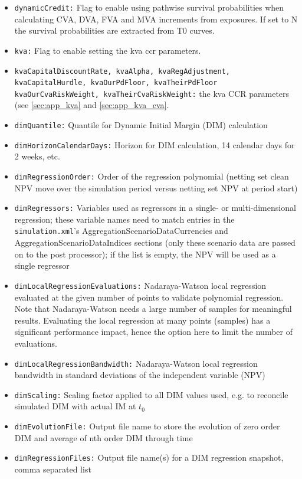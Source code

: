\documentclass[12pt, a4paper]{article}
\begin{document}
\begin{itemize}
\item {\tt dynamicCredit:} Flag to enable using pathwise survival probabilities when calculating CVA, DVA, FVA and MVA increments from exposures. If set to N the survival probabilities are extracted from T0 curves.
\item {\tt kva:} Flag to enable setting the kva ccr parameters.
\item {\tt kvaCapitalDiscountRate, kvaAlpha, kvaRegAdjustment, kvaCapitalHurdle, kvaOurPdFloor, kvaTheirPdFloor kvaOurCvaRiskWeight, kvaTheirCvaRiskWeight:} the kva CCR parameters (see \ref{sec:app_kva} and \ref{sec:app_kva_cva}.
\item {\tt dimQuantile:} Quantile for Dynamic Initial Margin (DIM) calculation
\item {\tt dimHorizonCalendarDays:} Horizon for DIM calculation, 14 calendar days for 2 weeks, etc.
\item {\tt dimRegressionOrder:} Order of the regression polynomial (netting set clean NPV move over the simulation
period versus netting set NPV at period start)
\item {\tt dimRegressors:} Variables used as regressors in a single- or multi-dimensional regression; these variable
  names need to match entries in the {\tt simulation.xml}'s AggregationScenarioDataCurrencies and
  AggregationScenarioDataIndices sections (only these scenario data are passed on to the post processor); if the list is
  empty, the NPV will be used as a single regressor
\item {\tt dimLocalRegressionEvaluations:} Nadaraya-Watson local regression evaluated at the given number of points to
validate polynomial regression. Note that Nadaraya-Watson needs a large number of samples for meaningful
results. Evaluating the local regression at many points (samples) has a significant performance impact, hence the option
here to limit the number of evaluations.
\item {\tt dimLocalRegressionBandwidth:} Nadaraya-Watson local regression bandwidth in standard deviations of the
independent variable (NPV)
\item {\tt dimScaling:} Scaling factor applied to all DIM values used, e.g. to reconcile simulated DIM with actual IM at
$t_0$
\item {\tt dimEvolutionFile:} Output file name to store the evolution of zero order DIM and average of nth order DIM
through time
\item {\tt dimRegressionFiles:} Output file name(s) for a DIM regression snapshot, comma separated list

\end{itemize}
\end{document}
